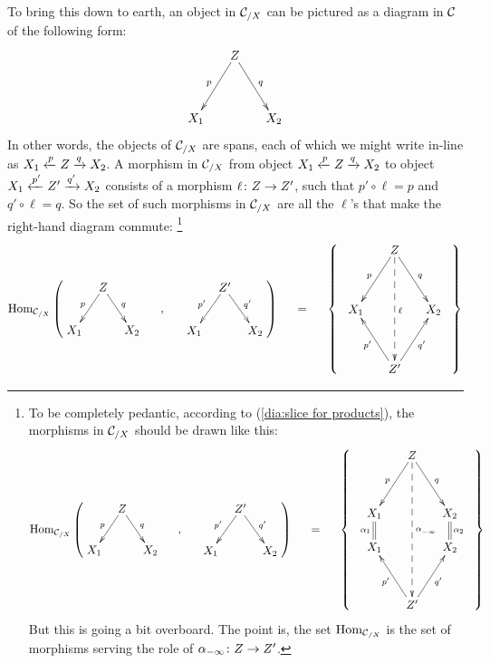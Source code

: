 \documentclass[CT4S-EN-RU]{subfiles}
\begin{document}
\begin{constructionENG}[Products]
To bring this down to earth, an object in $\mathcal{C}_{/X}$ can be pictured as a diagram in $\mathcal{C}$ of the following form:
$$\xymatrix@=15pt{&Z\ar[ldd]_p\ar[rdd]^q\\\\X_1&&X_2}$$   
In other words, the objects of $\mathcal{C}_{/X}$ are spans, each of which we might write in-line as $X_1\xleftarrow{p}Z\xrightarrow{q}X_2$. A morphism in $\mathcal{C}_{/X}$ from object $X_1\xleftarrow{p}Z\xrightarrow{q}X_2$ to object $X_1\xleftarrow{p'}Z'\xrightarrow{q'}X_2$ consists of a morphism $\ell\colon Z\rightarrow Z'$, such that $p'\circ\ell=p$ and $q'\circ\ell=q$. So the set of such morphisms in $\mathcal{C}_{/X}$ are all the $\ell$'s that make the right-hand diagram commute:
\footnote{To be completely pedantic, according to (\ref{dia:slice for products}), the morphisms in $\mathcal{C}_{/X}$ should be drawn like this:
\begin{align*}
\Hom_{\mcC_{/X}}\normalsize\left(\parbox{1in}{\xymatrix@=8pt{&Z\ar[ldd]_p\ar[rdd]^q\\\\X_1&&X_2}}\hspace{.2in},\hspace{.2in}\parbox{1in}{\xymatrix@=8pt{&Z'\ar[ldd]_{p'}\ar[rdd]^{q'}\\\\X_1&&X_2}}\right)\hspace{.2in}=\hspace{.2in}\left\{\;\;\parbox{1in}{\xymatrix@=15pt{&Z\ar[ldd]_{p}\ar[rdd]^{q}\ar@{-->}[ddddd]^{\alpha^{}_{-\infty}}\\\\X_1\ar@{=}[d]_{\alpha_1}&&X_2\ar@{=}[d]^{\alpha_2}\\X_1&&X_2\\\\&Z'\ar[uul]^{p'}\ar[uur]_{q'}}}\;\;\right\}
\end{align*}
But this is going a bit overboard. The point is, the set $\textnormal{Hom}_{\mathcal{C}_{/X}}$ is the set of morphisms serving the role of $\alpha_{-\infty}\colon Z\rightarrow Z'$.}
\begin{align}\label{dia:morphism of spans}
\Hom_{\mcC_{/X}}\normalsize\left(\parbox{1in}{\xymatrix@=8pt{&Z\ar[ldd]_p\ar[rdd]^q\\\\X_1&&X_2}}\hspace{.2in},\hspace{.2in}\parbox{1in}{\xymatrix@=8pt{&Z'\ar[ldd]_{p'}\ar[rdd]^{q'}\\\\X_1&&X_2}}\right)\hspace{.2in}=\hspace{.2in}\left\{\;\;\parbox{1in}{\xymatrix@=15pt{&Z\ar[ldd]_{p}\ar[rdd]^{q}\ar@{-->}[dddd]^\ell\\\\X_1&&X_2\\\\&Z'\ar[uul]^{p'}\ar[uur]_{q'}}}\;\;\right\}
\end{align}


\end{constructionENG}
\end{document}
